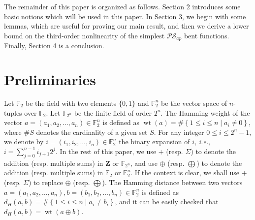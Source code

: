 \documentclass{article}
\newcommand{\Z}{\mathbf{Z}}
\newcommand{\F}{\mathbb{F}}
\newcommand{\0}{\textbf{0}}
\newcommand{\1}{\textbf{1}}
\newcommand{\wt}{\operatorname{wt}}
\theoremstyle{plain}
\begin{document}
    The remainder of this paper is organized as follows.  
    Section 2 introduces some basic notions which will be used in this paper. 
    In Section 3, we begin with some lemmas, which are useful for proving our main result, and then we derive a lower bound on the third-order nonlinearity of the simplest $\mathcal{PS}_{ap}$ bent functions. 
    Finally, Section 4 is a conclusion. 

\section{Preliminaries}
    Let $\F_2$ be the field with two elements $\{0,1\}$ and $\F_2^n$ be the vector space of $n$-tuples over $\F_2$. 
    Let $\F_{2^n}$ be the finite field of order $2^n$. 
    The Hamming weight of the vector $a=(a_1,a_2,\dots,a_n)\in\F_2^n$ is defined as $\wt(a)=\#\left\{ 1\le i\le n\mid a_i\ne 0 \right\}$, where $\#S$ denotes the cardinality of a given set $S$. 
    For any integer $0\le i \le 2^n-1$, we denote by $\overline{i}=(i_1,i_2,\dots,i_n)\in\F_2^n$ the binary expansion of $i$, \emph{i.e.}, $i=\sum_{j=0}^{n-1}i_{j+1}2^j$. 
    In the rest of this paper, we use $+$ (resp. $\Sigma$) to denote the addition (resp. multiple sums) in $\Z$ or $\F_{2^n}$, and use $\oplus$ (resp. $\bigoplus$) to denote the addition (resp. multiple sums) in $\F_2$ or $\F_2^n$. 
    If the context is clear, we shall use $+$ (resp. $\Sigma$) to replace $\oplus$ (resp. $\bigoplus$). 
    The Hamming distance between two vectors $a=(a_1,a_2,\dots,a_n),b=(b_1,b_2,\dots,b_n)\in\F_2^n$ is defined as $d_H(a,b)=\#\left\{ 1\le i\le n\middle| a_i\ne b_i \right\}$, and it can be easily checked that $d_H(a,b)=\wt(a\oplus b)$. 
    
\end{document}
